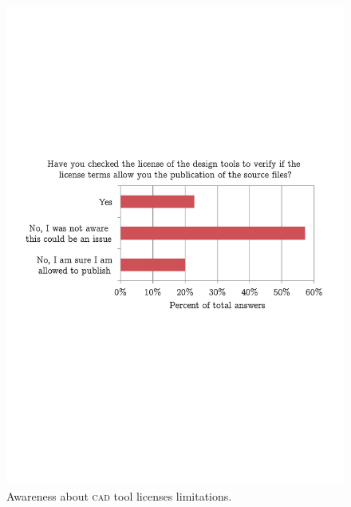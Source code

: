 \documentclass[letterpaper, 10 pt, conference]{ieeeconf}  %
\begin{document}
\begin{figure}
\centering
\includegraphics[width=\columnwidth]{figures/checklicense}
\caption{Awareness about \textsc{cad} tool licenses limitations.}
\label{fig:aware}
\end{figure}
\end{document}
